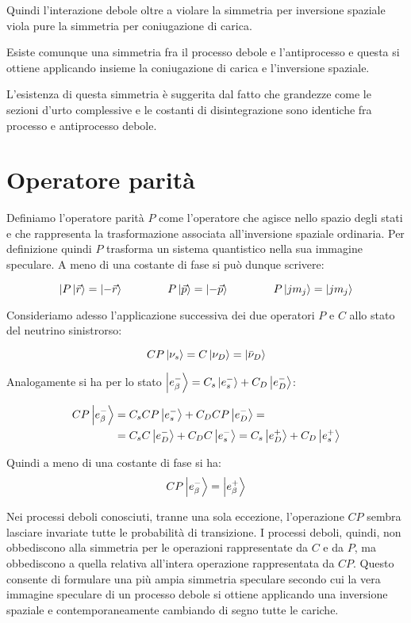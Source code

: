 Quindi l'interazione debole oltre a violare la simmetria per inversione spaziale
viola pure la simmetria per coniugazione di carica.

Esiste comunque una simmetria fra il processo debole e l'antiprocesso e questa
si ottiene applicando insieme la coniugazione di carica e l'inversione spaziale.

L'esistenza di questa simmetria è suggerita dal fatto che grandezze come le
sezioni d'urto complessive e le costanti di disintegrazione sono identiche fra
processo e antiprocesso debole. 

\chapter{Operatore parità}

Definiamo l'operatore parità $P$ come l'operatore che agisce nello spazio degli
stati e che rappresenta la trasformazione associata all'inversione spaziale
ordinaria. Per definizione quindi $P$ trasforma un sistema quantistico nella sua
immagine speculare. A meno di una costante di fase si può dunque scrivere:

\begin{equation*}
| P \Ket{\vec{r}} = \Ket{-\vec{r}} \qquad \qquad P \Ket{\vec{p}}=\Ket{-\vec{p}} \qquad \qquad P \Ket{ j m_j} = \Ket{j m_j}
\end{equation*}

Consideriamo adesso l'applicazione successiva dei due operatori $P$ e $C$ allo
stato del neutrino sinistrorso:

\begin{equation*}
C P \Ket{\nu_s} = C \Ket{\nu_D} = \Ket{\bar{\nu}_D}
\end{equation*}

Analogamente si ha per lo stato $\Ket{e^-_\beta} = C_s\Ket{e^-_s} + C_D
\Ket{e^-_D}$:

\begin{align*}
C P \Ket{e^-_\beta} &= C_s C P \Ket{e^-_s} + C_D C P \Ket{e^-_D} = \\
&= C_s C \Ket{e^-_D} + C_D C \Ket{e^-_s} = C_s \Ket{e^+_D} + C_D \Ket{e^+_s}
\end{align*}

Quindi a meno di una costante di fase si ha:
\begin{equation*}
  CP  \Ket{e^-_\beta} = \Ket{e^+_\beta}
\end{equation*}

Nei processi deboli conosciuti, tranne una sola eccezione, l'operazione $C P$
sembra lasciare invariate tutte le probabilità di transizione. I processi
deboli, quindi, non obbediscono alla simmetria per le operazioni rappresentate
da $C$ e da $P$, ma obbediscono a quella relativa all'intera operazione
rappresentata da $CP$. Questo consente di formulare una più ampia simmetria
speculare secondo cui la vera immagine speculare di un processo debole si
ottiene applicando una inversione spaziale e contemporaneamente cambiando di
segno tutte le cariche.

